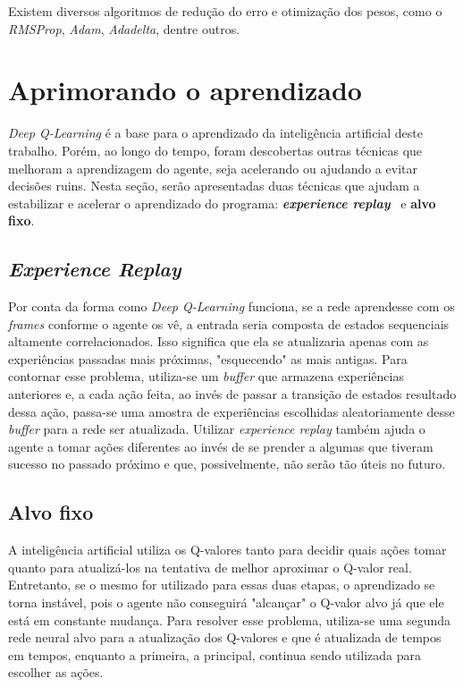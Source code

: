 Existem diversos algoritmos de redução do erro e otimização dos pesos, como o \textit{RMSProp}, \textit{Adam}, \textit{Adadelta}, dentre outros.


\section{Aprimorando o aprendizado}
\label{sec:enhance}

\textit{Deep Q-Learning} é a base para o aprendizado da inteligência artificial deste trabalho.
Porém, ao longo do tempo, foram descobertas outras técnicas que melhoram a aprendizagem do agente, seja acelerando ou ajudando a evitar decisões ruins.
Nesta seção, serão apresentadas duas técnicas que ajudam a estabilizar e acelerar o aprendizado do programa:
\textit{\textbf{experience replay}}~\cite{Lin1992} e \textbf{alvo fixo}.


\subsection{\textit{Experience Replay}}
\label{sec:er}

Por conta da forma como \textit{Deep Q-Learning} funciona, se a rede aprendesse com os \textit{frames} conforme o agente os vê, a entrada seria composta de estados sequenciais altamente correlacionados.
Isso significa que ela se atualizaria apenas com as experiências passadas mais próximas, "esquecendo"{} as mais antigas.
Para contornar esse problema, utiliza-se um \textit{buffer} que armazena experiências anteriores e, a cada ação feita, ao invés de passar a transição de estados resultado dessa ação, passa-se uma amostra de experiências escolhidas aleatoriamente desse \textit{buffer} para a rede ser atualizada.
Utilizar \textit{experience replay} também ajuda o agente a tomar ações diferentes ao invés de se prender a algumas que tiveram sucesso no passado próximo e que, possivelmente, não serão tão úteis no futuro.


\subsection{Alvo fixo}
\label{sec:ft}

A inteligência artificial utiliza os Q-valores tanto para decidir quais ações tomar quanto para atualizá-los na tentativa de melhor aproximar o Q-valor real.
Entretanto, se o mesmo for utilizado para essas duas etapas, o aprendizado se torna instável, pois o agente não conseguirá "alcançar"{} o Q-valor alvo já que ele está em constante mudança.
Para resolver esse problema, utiliza-se uma segunda rede neural alvo para a atualização dos Q-valores e que é atualizada de tempos em tempos, enquanto a primeira, a principal, continua sendo utilizada para escolher as ações.

